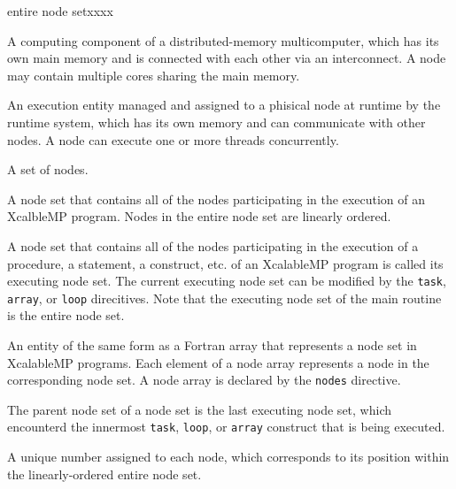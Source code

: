 \begin{namelist}{entire node setxxxx}


 A computing component of a distributed-memory multicomputer, which has
 its own main memory and is connected with each other via an
 interconnect. A node may contain multiple cores sharing the main
 memory.



 An execution entity managed and assigned to a phisical node at runtime
 by the {\XMP} runtime system, which has its own memory and can
 communicate with other nodes. A node can execute one or more threads
 concurrently.


 A set of nodes.


 A node set that contains all of the nodes participating in the
 execution of an XcalbleMP program. Nodes in the entire node set are
 linearly ordered.


 A node set that contains all of the nodes participating in the
 execution of a procedure, a statement, a construct, etc. of an
 XcalableMP program is called its executing node set. The current
 executing node set can be modified by the {\tt task}, {\tt array}, or
 {\tt loop} direcitives. Note that the executing node set of the main
 routine is the entire node set.


 An {\XMP} entity of the same form as a Fortran array that represents a
 node set in XcalableMP programs. Each element of a node array
 represents a node in the corresponding node set. A node array is
 declared by the {\tt nodes} directive.


 The parent node set of a node set is the last executing node set, which
 encounterd the innermost {\tt task}, {\tt loop}, or {\tt array}
 construct that is being executed.


 A unique number assigned to each node, which corresponds to its
 position within the linearly-ordered entire node set.


\end{namelist}
